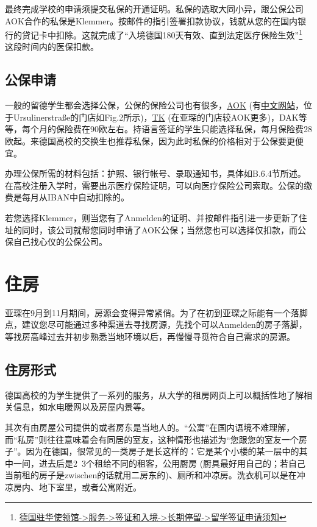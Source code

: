    最终完成学校的申请须提交私保的开通证明。私保的选取大同小异，跟公保公司AOK合作的私保是Klemmer。按邮件的指引签署扣款协议，钱就从您的在国内银行的贷记卡中扣除。这就完成了``入境德国180天有效、直到法定医疗保险生效''\footnote{\href{https://china.diplo.de/blob/1341652/cd1526772cd3d64a3f122f07d908a16b/pdf-merkblatt-natvisum-studium-data.pdf}{德国驻华使领馆->服务->签证和入境->长期停留->留学签证申请须知}} 这段时间内的医保扣款。

  \subsection{公保申请}\label{subsec:公保申请}

    一般的留德学生都会选择公保，公保的保险公司也有很多，\href{https://www.aok.de/}{AOK} (有\href{http://www.aok-cn.com/}{中文网站}，位于Ursulinerstraße的门店如Fig.2所示)，\href{https://www.tk.de/techniker}{TK} (在亚琛的门店较AOK更多)，DAK等等，每个月的保险费在90欧左右。持语言签证的学生只能选择私保，每月保险费28欧起。来德国高校的交换生也推荐私保，因为此时私保的价格相对于公保要更便宜。

    办理公保所需的材料包括：护照、银行帐号、录取通知书，具体如B.6.4节所述。在高校注册入学时，需要出示医疗保险证明，可以向医疗保险公司索取。公保的缴费是每月从IBAN中自动扣除的。

    若您选择Klemmer，则当您有了Anmelden的证明、并按邮件指引进一步更新了住址的同时，该公司就帮您同时申请了AOK公保；当然您也可以选择仅扣款，而公保自己找心仪的公保公司。

\section{住房}\label{sec:住房}

  亚琛在9月到11月期间，房源会变得异常紧俏。为了在初到亚琛之际能有一个落脚点，建议您尽可能通过多种渠道去寻找房源，先找个可以Anmelden的房子落脚，等找房高峰过去并初步熟悉当地环境以后，再慢慢寻觅符合自己需求的房源。

  \subsection{住房形式}\label{subsec:住房形式}

    德国高校的为学生提供了一系列的服务，从大学的租房网页上可以概括性地了解相关信息，如水电暖网以及房屋内景等。

    其次有由房屋公司提供的或者房东是当地人的。``公寓''在国内语境不难理解，而``私房''则往往意味着会有同居的室友，这种情形也描述为``您跟您的室友一个房子''。因为在德国，很常见的一类房子是长这样的：它是某个小楼的某一层中的其中一间，进去后是2~3个租给不同的租客，公用厨房 (厨具最好用自己的；若自己当前租的房子是zwischen的话就用二房东的)、厕所和冲凉房。洗衣机可以是在冲凉房内、地下室里，或者公寓附近。

